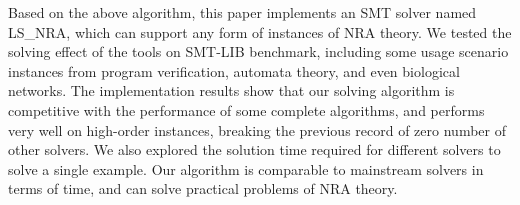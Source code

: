 Based on the above algorithm, this paper implements an SMT solver named LS\_NRA, which can support any form of instances of NRA theory. We tested the solving effect of the tools on SMT-LIB benchmark, including some usage scenario instances from program verification, automata theory, and even biological networks. The implementation results show that our solving algorithm is competitive with the performance of some complete algorithms, and performs very well on high-order instances, breaking the previous record of zero number of other solvers. We also explored the solution time required for different solvers to solve a single example. Our algorithm is comparable to mainstream solvers in terms of time, and can solve practical problems of NRA theory.

